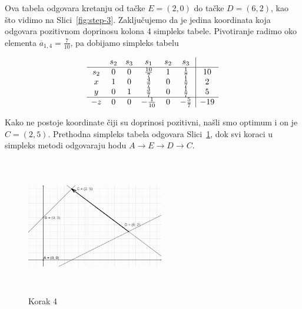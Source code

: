 \documentclass[a4paper, utf8, 11pt, colorlinks]{book}
\begin{document}
Ova tabela odgovara kretanju od tačke $E=(2,0)$ do tačke $D=(6,2)$, kao što vidimo na Slici~\ref{fig:step-3}.
Zaključujemo da je jedina koordinata koja odgovara pozitivnom doprinosu kolona 
4 simpleks tabele. Pivotiranje radimo oko elementa $\overline{a}_{1,4} = \frac{7}{10}$, pa dobijamo simpleks tabelu 

$$\begin{array}{cccccc| c}
	& s_2  & s_3   & s_1  & s_2 & s_3 &     \\ \hline
s_2 &  0   &  0    & \frac{10}{7}    &  1   & \frac{1}{7}   & 10 \\
x   &  1   &  0    &  \frac{4}{7}    &  0   & \frac{1}{7}  & 2 \\
y   &  0   &  1    &  \frac{3}{7}    &  0   & \frac{1}{7}   & 5  \\ \hline
-z  &  0   &  0   &   -\frac{1}{10}  & 0    &  -\frac{5}{7} & -19 \\
\end{array}
$$ 

Kako ne postoje koordinate čiji su doprinosi pozitivni, našli smo optimum i on je   
$C=(2,5)$. Prethodna simpleks tabela odgovara Slici~\ref{fig:step-4}, dok svi koraci u simpleks metodi odgovaraju 
hodu $A \rightarrow E \rightarrow D \rightarrow C$. 

\begin{figure}[H]
	\centering
	\includegraphics[width=170pt, height=170pt]{simpleks-primjer-2-sl4.eps}
	\caption{Korak 4}
	\label{fig:step-4}
\end{figure}
\end{document}
